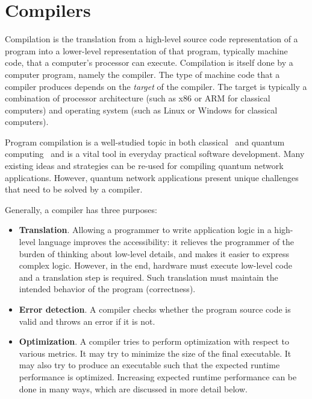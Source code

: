 \section{Compilers}
Compilation is the translation from a high-level source code representation of a program into a lower-level representation of that program, typically machine code, that a computer's processor can execute.
Compilation is itself done by a computer program, namely the compiler.
The type of machine code that a compiler produces depends on the \emph{target} of the compiler.
The target is typically a combination of processor architecture (such as x86 or ARM for classical computers) and operating system (such as Linux or Windows for classical computers).

Program compilation is a well-studied topic in both classical~\cite{aho_compilers_2006} and quantum computing~\cite{chong_programming_2017} and is a vital tool in everyday practical software development.
Many existing ideas and strategies can be re-used for compiling quantum network applications.
However, quantum network applications present unique challenges that need to be solved by a compiler.

Generally, a compiler has three purposes:

\begin{itemize}

\item \textbf{Translation}.
Allowing a programmer to write application logic in a high-level language improves the accessibility:
it relieves the programmer of the burden of thinking about low-level details, and makes it easier to express complex logic.
However, in the end, hardware must execute low-level code and a translation step is required.
Such translation must maintain the intended behavior of the program (correctness).

\item \textbf{Error detection}.
A compiler checks whether the program source code is valid and throws an error if it is not.

\item \textbf{Optimization}.
A compiler tries to perform optimization with respect to various metrics.
It may try to minimize the size of the final executable.
It may also try to produce an executable such that the expected runtime performance is optimized.
Increasing expected runtime performance can be done in many ways, which are discussed in more detail below.

\end{itemize}



